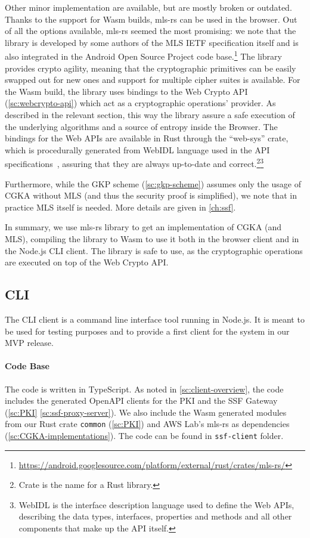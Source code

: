 Other minor implementation are available, but are mostly broken or outdated.
Thanks to the support for Wasm builds, mls-rs can be used in the browser.
Out of all the options available, mls-rs seemed the most promising:
we note that the library is developed by some authors of the MLS IETF
specification itself and is also integrated in the Android Open Source Project
code base.\footnote{\url{https://android.googlesource.com/platform/external/rust/crates/mls-rs/}}
The library provides crypto agility, meaning that the cryptographic
primitives can be easily swapped out for new ones and support for multiple cipher suites is available.
For the Wasm build, the library uses bindings to the Web Crypto API 
(\cref{sc:webcrypto-api}) which act as a cryptographic operations' provider.
As described in the relevant section, 
this way the library assure a safe execution of the underlying
algorithms and a source of entropy inside the Browser. 
The bindings for the Web APIs are available in Rust 
through the ``web-sys'' crate,
which is procedurally generated from WebIDL language
used in the API specifications~\cite{WebSys}, assuring
that they are always up-to-date and correct.\footnote{Crate is the name for a Rust library.}\footnote{WebIDL is the interface description language used to define the Web APIs, describing the data types, interfaces, properties and methods and all other components that make up the API itself.} 

Furthermore, while the GKP scheme (\cref{sc:gkp-scheme})
assumes only the usage of CGKA without MLS (and thus the security proof
is simplified), we note that in practice MLS itself is needed.
More details are given in \cref{ch:ssf}.

In summary, we use mls-rs library to get an implementation
of CGKA (and MLS), compiling the library to Wasm to use it both
in the browser client and in the Node.js CLI client. The library is
safe to use, as the cryptographic operations are executed on top of the Web Crypto API.


\subsection{CLI}\label{CLI}

The CLI client is a command line interface tool running in Node.js.
It is meant to be used for testing purposes and to provide a
first client for the system in our MVP release.


\paragraph{Code Base} 
The code is written in TypeScript. 
As noted in \cref{sc:client-overview}, the code includes the
generated OpenAPI clients for the PKI and the SSF Gateway
(\cref{sc:PKI} \cref{sc:ssf-proxy-server}).
We also include the Wasm generated modules 
from our Rust crate \texttt{common} (\cref{sc:PKI}) 
and AWS Lab's mls-rs as dependencies
(\cref{sc:CGKA-implementations}).
The code can be found in \texttt{ssf-client} folder.

